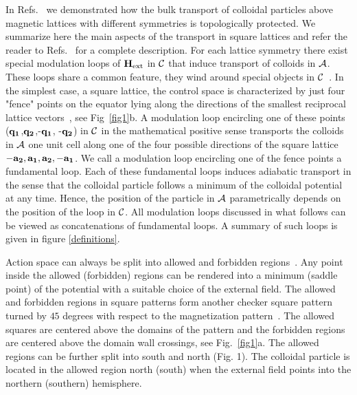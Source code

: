 \documentclass[12pt]{iopart}
\begin{document}
In Refs.~\cite{tp1,tp2,tp3} we demonstrated how the bulk transport of colloidal particles
above magnetic lattices with different symmetries is topologically protected. We summarize here
the main aspects of the transport in square lattices and refer the reader to Refs.~\cite{tp2,tp3} for a complete description.
For each lattice symmetry there exist special modulation loops of $\bf{H}_{\textrm{ext}}$ in $\cal C$ that induce transport of
colloids in $\cal A$. These loops share a common feature, they wind around special objects in $\cal C$~\cite{tp1,tp2,tp3}.
In the simplest case, a square lattice, the control space is characterized by just four "fence" points on the equator
lying along the directions of the smallest reciprocal lattice vectors~\cite{tp2}, see Fig~\ref{fig1}b.  A modulation
loop encircling one of these points ($\bf q_1$,$\bf q_2$,-$\bf q_1$, -$\bf q_2$) in $\cal C$ in the
mathematical positive sense  transports the colloids in $\cal A$ one unit cell along 
one of the four possible directions of the square lattice $-\bf {a}_2,\bf {a}_1,\bf {a}_2, -\bf {a}_1$. We call a modulation loop encircling one of the fence points a fundamental loop.
Each of these fundamental loops induces adiabatic transport in the sense that the colloidal particle follows a minimum
of the colloidal potential at any time. Hence, the position of the particle in ${\cal A}$  parametrically depends on the
position of the loop in ${\cal C}$. All modulation loops discussed in what follows can be viewed as concatenations of fundamental loops. A summary of such loops is given in figure \ref{definitions}.

Action space can always be split into allowed and forbidden regions~\cite{tp1,tp2,tp3}. Any point inside the allowed (forbidden) regions 
can be rendered into a minimum (saddle point) of the potential with a suitable choice of the external field.
The allowed and forbidden regions in square patterns form another checker square pattern turned by $45$ degrees with respect to the
magnetization pattern~\cite{tp2}. The allowed squares are centered above the domains of the pattern and the forbidden regions are centered
above the domain wall crossings, see Fig.~\ref{fig1}a. The allowed regions can be further split into south and north (Fig. 1). The colloidal particle is located in the allowed region north (south) when the external field points into the northern (southern) hemisphere.
\end{document}
